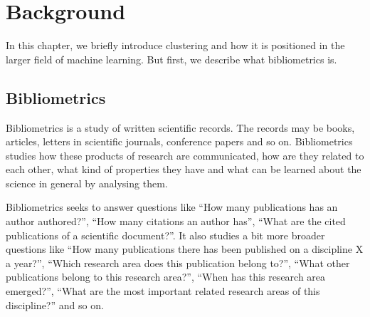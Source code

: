 \chapter{Background}
\label{chapter:background}

% 


In this chapter, we briefly introduce clustering and how it is 
positioned in the larger field of machine learning. But first, we
describe what bibliometrics is.

\section{Bibliometrics}
\label{sec:bibliometrics}
Bibliometrics is a study of written scientific records. The 
records may be books, articles, letters in scientific journals, 
conference papers and so on. Bibliometrics studies how these 
products of research are communicated, how are they related to 
each other, what kind of properties they have and what can be 
learned about the science in general by analysing them.

Bibliometrics seeks to answer questions like ``How many 
publications has an author authored?'', ``How many citations an 
author has'', ``What are the 
cited publications of a scientific document?''. It also studies
a bit more broader questions like ``How many publications there 
has been published on a discipline X a year?'', ``Which research area
does this publication belong to?'', ``What other publications 
belong to this research area?'', ``When has this research area
emerged?'', ``What are the most important related research areas
of this discipline?'' and so 
on.\cite{pritchard_statistical_1969}\cite{broadus_toward_1987}

